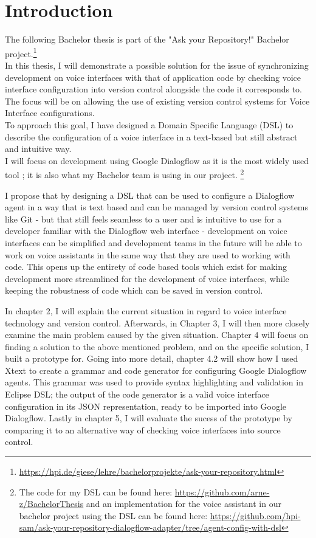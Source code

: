 
\chapter{Introduction}

The following Bachelor thesis is part of the "Ask your Repository!" Bachelor project.\footnote{\url{https://hpi.de/giese/lehre/bachelorprojekte/ask-your-repository.html}}\\
In this thesis, I will demonstrate a possible solution for the issue of synchronizing development on voice interfaces with that of application code by checking voice interface configuration into version control alongside the code it corresponds to. The focus will be on allowing the use of existing version control systems for Voice Interface configurations.\\
To approach this goal, I have designed a Domain Specific Language (DSL) to describe the configuration of a voice interface in a text-based but still abstract and intuitive way. \\
I will focus on development using Google Dialogflow as it is the most widely used tool \cite{Stackshare}; it is also what my Bachelor team is using in our project.
\footnote{The code for my DSL can be found here: \url{https://github.com/arne-z/BachelorThesis} and an implementation for the voice assistant in our bachelor project using the DSL can be found here: \url{https://github.com/hpi-sam/ask-your-repository-dialogflow-adapter/tree/agent-config-with-dsl}}

I propose that by designing a DSL that can be used to configure a Dialogflow agent in a way that is text based and can be managed by version control systems like Git - but that still feels seamless to a user and is intuitive to use for a developer familiar with the Dialogflow web interface - development on voice interfaces can be simplified and development teams in the future will be able to work on voice assistants in the same way that they are used to working with code. This opens up the entirety of code based tools which exist for making development more streamlined for the development of voice interfaces, while keeping the robustness of code which can be saved in version control.

In chapter 2, I will explain the current situation in regard to voice interface technology and version control. Afterwards, in Chapter 3, I will then more closely examine the main problem caused by the given situation.
Chapter 4 will focus on finding a solution to the above mentioned problem, and on the specific solution, I built a prototype for. Going into more detail, chapter 4.2 will show how I used Xtext to create a grammar and code generator for configuring Google Dialogflow agents. This grammar was used to provide syntax highlighting and validation in Eclipse DSL; the output of the code generator is a valid voice interface configuration in its JSON representation, ready to be imported into Google Dialogflow.
Lastly in chapter 5, I will evaluate the sucess of the prototype by comparing it to an alternative way of checking voice interfaces into source control. 

